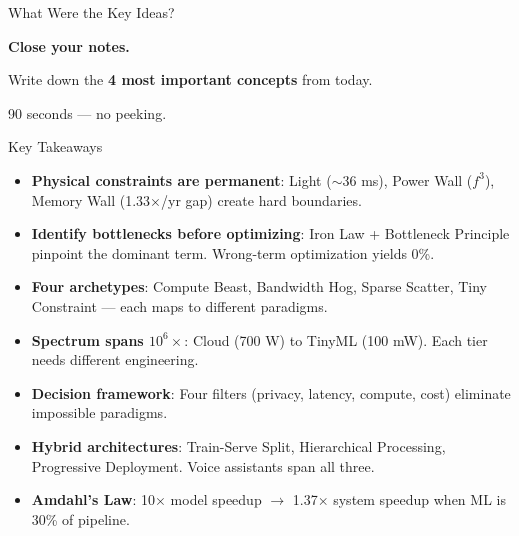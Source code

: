 \documentclass[aspectratio=169, 12pt]{beamer}
\begin{document}
\begin{frame}{What Were the Key Ideas?}
\note{
%
}

\centering
\vspace{1.5cm}
{\Large\bfseries Close your notes.}

\vspace{0.8cm}
{\large Write down the \textbf{4 most important concepts} from today.}

\vspace{0.8cm}
{\normalsize\textcolor{midgray}{90 seconds --- no peeking.}}

\end{frame}

\begin{frame}{Key Takeaways}
\note{
%
}

\scriptsize
\begin{itemize}\setlength\itemsep{0pt}
  \item \textbf{Physical constraints are permanent}: Light ($\sim$36 ms), Power Wall ($f^3$), Memory Wall (1.33$\times$/yr gap) create hard boundaries.
  \item \textbf{Identify bottlenecks before optimizing}: Iron Law + Bottleneck Principle pinpoint the dominant term. Wrong-term optimization yields 0\%.
  \item \textbf{Four archetypes}: Compute Beast, Bandwidth Hog, Sparse Scatter, Tiny Constraint --- each maps to different paradigms.
  \item \textbf{Spectrum spans $10^{6}\!\times$}: Cloud (700 W) to TinyML (100 mW). Each tier needs different engineering.
  \item \textbf{Decision framework}: Four filters (privacy, latency, compute, cost) eliminate impossible paradigms.
  \item \textbf{Hybrid architectures}: Train-Serve Split, Hierarchical Processing, Progressive Deployment. Voice assistants span all three.
  \item \textbf{Amdahl's Law}: 10$\times$ model speedup $\to$ 1.37$\times$ system speedup when ML is 30\% of pipeline.
\end{itemize}

\end{frame}
\end{document}
